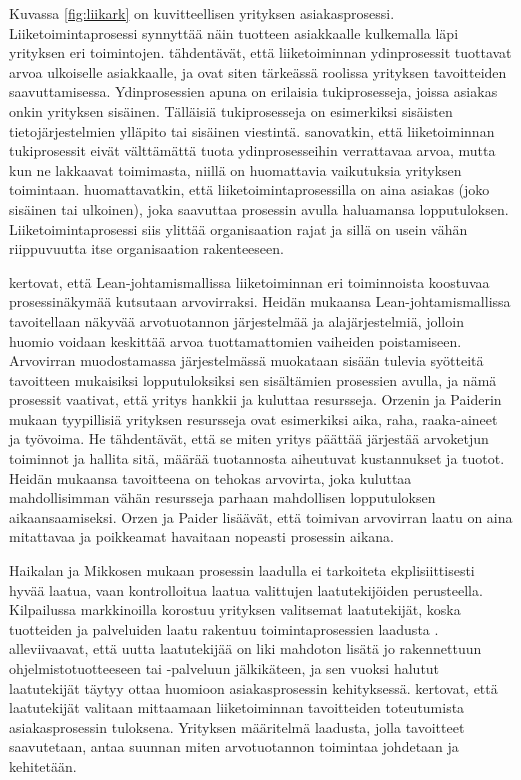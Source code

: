 \documentclass[finnish,12pt,a4paper,pdftex]{article}
\begin{document}
Kuvassa \ref{fig:liikark} on kuvitteellisen yrityksen asiakasprosessi. Liiketoimintaprosessi synnyttää näin tuotteen asiakkaalle kulkemalla läpi yrityksen eri toimintojen. \cite{ohjelmistotuotanto} tähdentävät, että liiketoiminnan ydinprosessit tuottavat arvoa ulkoiselle asiakkaalle, ja ovat siten tärkeässä roolissa yrityksen tavoitteiden saavuttamisessa. Ydinprosessien apuna on erilaisia tukiprosesseja, joissa asiakas onkin yrityksen sisäinen. Tälläisiä tukiprosesseja on esimerkiksi sisäisten tietojärjestelmien ylläpito tai sisäinen viestintä. \cite{okaytannot} sanovatkin, että liiketoiminnan tukiprosessit eivät välttämättä tuota ydinprosesseihin verrattavaa arvoa, mutta kun ne lakkaavat toimimasta, niillä on huomattavia vaikutuksia yrityksen toimintaan. \citeauthor{okaytannot} huomattavatkin, että liiketoimintaprosessilla on aina asiakas (joko sisäinen tai ulkoinen), joka saavuttaa prosessin avulla haluamansa lopputuloksen. Liiketoimintaprosessi siis ylittää organisaation rajat ja sillä on usein vähän riippuvuutta itse organisaation rakenteeseen.

\cite{leanit} kertovat, että Lean-johtamismallissa liiketoiminnan eri toiminnoista koostuvaa prosessinäkymää kutsutaan arvovirraksi. Heidän mukaansa Lean-johtamismallissa tavoitellaan näkyvää arvotuotannon järjestelmää ja alajärjestelmiä, jolloin huomio voidaan keskittää arvoa tuottamattomien vaiheiden poistamiseen. Arvovirran muodostamassa järjestelmässä muokataan sisään tulevia syötteitä tavoitteen mukaisiksi lopputuloksiksi sen sisältämien prosessien avulla, ja nämä prosessit vaativat, että yritys hankkii ja kuluttaa resursseja. Orzenin ja Paiderin mukaan tyypillisiä yrityksen resursseja ovat esimerkiksi aika, raha, raaka-aineet ja työvoima. He tähdentävät, että se miten yritys päättää järjestää arvoketjun toiminnot ja hallita sitä, määrää tuotannosta aiheutuvat kustannukset ja tuotot. Heidän mukaansa tavoitteena on tehokas arvovirta, joka kuluttaa mahdollisimman vähän resursseja parhaan mahdollisen lopputuloksen aikaansaamiseksi. Orzen ja Paider lisäävät, että toimivan arvovirran laatu on aina mitattavaa ja poikkeamat havaitaan nopeasti prosessin aikana.

Haikalan ja Mikkosen \citeyearpar{okaytannot} mukaan prosessin laadulla ei tarkoiteta ekplisiittisesti hyvää laatua, vaan kontrolloitua laatua valittujen laatutekijöiden perusteella. Kilpailussa markkinoilla korostuu yrityksen valitsemat laatutekijät, koska tuotteiden ja palveluiden laatu rakentuu toimintaprosessien laadusta \citep{ohjelmistotuotanto, teollisuustalous}. \cite{okaytannot} alleviivaavat, että uutta laatutekijää on liki mahdoton lisätä jo rakennettuun ohjelmistotuotteeseen tai -palveluun jälkikäteen, ja sen vuoksi halutut laatutekijät täytyy ottaa huomioon asiakasprosessin kehityksessä. \cite{ohjelmistotuotanto} kertovat, että laatutekijät valitaan mittaamaan liiketoiminnan tavoitteiden toteutumista asiakasprosessin tuloksena. Yrityksen määritelmä laadusta, jolla tavoitteet saavutetaan, antaa suunnan miten arvotuotannon toimintaa johdetaan ja kehitetään. 
\end{document}

